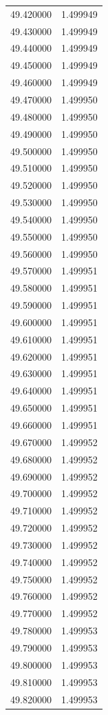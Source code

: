 \begin{tabular}{rr}
49.420000 & 1.499949 \\
49.430000 & 1.499949 \\
49.440000 & 1.499949 \\
49.450000 & 1.499949 \\
49.460000 & 1.499949 \\
49.470000 & 1.499950 \\
49.480000 & 1.499950 \\
49.490000 & 1.499950 \\
49.500000 & 1.499950 \\
49.510000 & 1.499950 \\
49.520000 & 1.499950 \\
49.530000 & 1.499950 \\
49.540000 & 1.499950 \\
49.550000 & 1.499950 \\
49.560000 & 1.499950 \\
49.570000 & 1.499951 \\
49.580000 & 1.499951 \\
49.590000 & 1.499951 \\
49.600000 & 1.499951 \\
49.610000 & 1.499951 \\
49.620000 & 1.499951 \\
49.630000 & 1.499951 \\
49.640000 & 1.499951 \\
49.650000 & 1.499951 \\
49.660000 & 1.499951 \\
49.670000 & 1.499952 \\
49.680000 & 1.499952 \\
49.690000 & 1.499952 \\
49.700000 & 1.499952 \\
49.710000 & 1.499952 \\
49.720000 & 1.499952 \\
49.730000 & 1.499952 \\
49.740000 & 1.499952 \\
49.750000 & 1.499952 \\
49.760000 & 1.499952 \\
49.770000 & 1.499952 \\
49.780000 & 1.499953 \\
49.790000 & 1.499953 \\
49.800000 & 1.499953 \\
49.810000 & 1.499953 \\
49.820000 & 1.499953 \\

\end{tabular}
